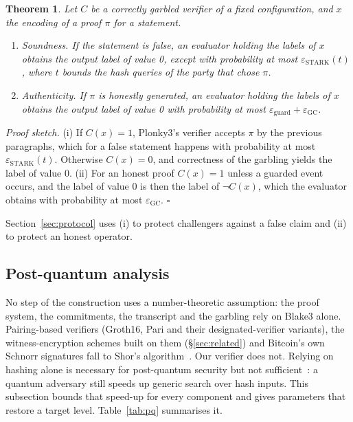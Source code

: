 \documentclass[11pt]{article}
\newtheorem{theorem}{Theorem}
\begin{document}
\begin{theorem}\label{thm:main}
Let $C$ be a correctly garbled verifier of a fixed configuration, and $x$ the
encoding of a proof $\pi$ for a statement.
\begin{enumerate}
  \item[(i)] \emph{Soundness.} If the statement is false, an evaluator holding the
    labels of $x$ obtains the output label of value 0, except with probability at
    most $\varepsilon_{\mathrm{STARK}}(t)$, where $t$ bounds the hash queries of
    the party that chose $\pi$.
  \item[(ii)] \emph{Authenticity.} If $\pi$ is honestly generated, an evaluator
    holding the labels of $x$ obtains the output label of value 0 with probability
    at most $\varepsilon_{\mathrm{guard}}+\varepsilon_{\mathrm{GC}}$.
\end{enumerate}
\end{theorem}

\noindent\emph{Proof sketch.} (i) If $C(x)=1$, Plonky3's verifier accepts $\pi$ by
the previous paragraphs, which for a false statement happens with probability at
most $\varepsilon_{\mathrm{STARK}}(t)$. Otherwise $C(x)=0$, and correctness of the
garbling yields the label of value 0. (ii) For an honest proof $C(x)=1$ unless a
guarded event occurs, and the label of value 0 is then the label of $\neg C(x)$,
which the evaluator obtains with probability at most
$\varepsilon_{\mathrm{GC}}$. \hfill$\square$

\smallskip\noindent Section~\ref{sec:protocol} uses (i) to protect challengers
against a false claim and (ii) to protect an honest operator.

\subsection{Post-quantum analysis}\label{sec:pq}

No step of the construction uses a number-theoretic assumption: the proof
system, the commitments, the transcript and the garbling rely on Blake3 alone.
Pairing-based verifiers (Groth16, Pari and their designated-verifier variants),
the witness-encryption schemes built on them (\S\ref{sec:related}) and Bitcoin's
own Schnorr signatures fall to Shor's algorithm~\cite{shor94}. Our verifier does
not. Relying on hashing alone is necessary for post-quantum security but not
sufficient~\cite{zkmhashpq}: a quantum adversary still speeds up generic search
over hash inputs. This subsection bounds that speed-up for every component and
gives parameters that restore a target level. Table~\ref{tab:pq} summarises it.
\end{document}
